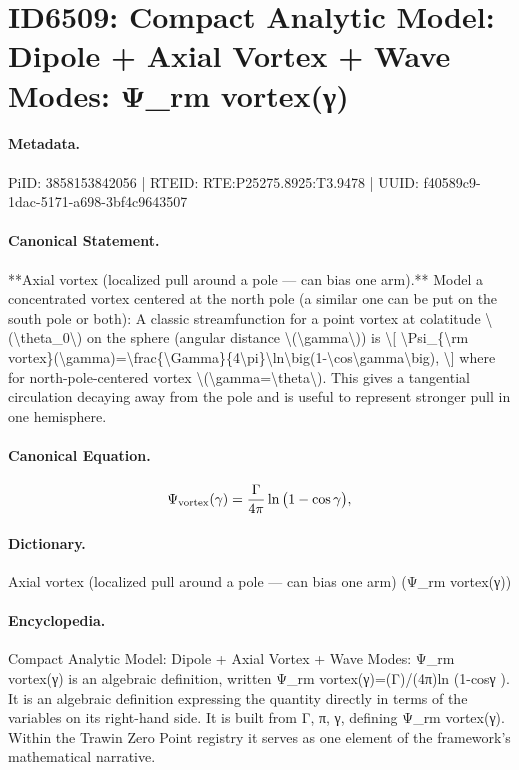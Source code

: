 \section*{ID6509: Compact Analytic Model: Dipole + Axial Vortex + Wave Modes: Ψ\_rm vortex(γ)}
\paragraph{Metadata.}
PiID: 3858153842056 | RTEID: RTE:P25275.8925:T3.9478 | UUID: f40589c9-1dac-5171-a698-3bf4c9643507

\paragraph{Canonical Statement.}
**Axial vortex (localized pull around a pole — can bias one arm).** Model a concentrated vortex centered at the north pole (a similar one can be put on the south pole or both): A classic streamfunction for a point vortex at colatitude \textbackslash{}(\textbackslash{}theta\_0\textbackslash{}) on the sphere (angular distance \textbackslash{}(\textbackslash{}gamma\textbackslash{})) is \textbackslash{}[ \textbackslash{}Psi\_\{\textbackslash{}rm vortex\}(\textbackslash{}gamma)=\textbackslash{}frac\{\textbackslash{}Gamma\}\{4\textbackslash{}pi\}\textbackslash{}ln\textbackslash{}big(1-\textbackslash{}cos\textbackslash{}gamma\textbackslash{}big), \textbackslash{}] where for north-pole-centered vortex \textbackslash{}(\textbackslash{}gamma=\textbackslash{}theta\textbackslash{}). This gives a tangential circulation decaying away from the pole and is useful to represent stronger pull in one hemisphere.

\paragraph{Canonical Equation.}
\[
\Psi_{\rm vortex}(\gamma)=\frac{\Gamma}{4\pi}\ln\big(1-\cos\gamma\big),
\]

\paragraph{Dictionary.}
Axial vortex (localized pull around a pole — can bias one arm) (Ψ\_rm vortex(γ))

\paragraph{Encyclopedia.}
Compact Analytic Model: Dipole + Axial Vortex + Wave Modes: Ψ\_rm vortex(γ) is an algebraic definition, written Ψ\_rm vortex(γ)=(Γ)/(4π)ln (1-cosγ ). It is an algebraic definition expressing the quantity directly in terms of the variables on its right-hand side. It is built from Γ, π, γ, defining Ψ\_rm vortex(γ). Within the Trawin Zero Point registry it serves as one element of the framework's mathematical narrative.
